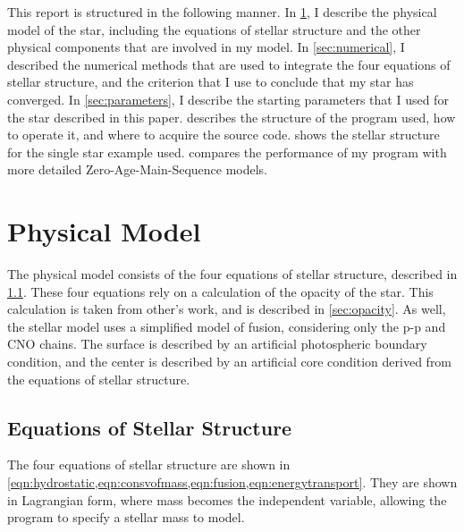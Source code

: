 \documentclass[12pt]{article}
\begin{document}
This report is structured in the following manner. In \cref{sec:physicalmodel}, I describe the physical model of the star, including the equations of stellar structure and the other physical components that are involved in my model. In \cref{sec:numerical}, I described the numerical methods that are used to integrate the four equations of stellar structure, and the criterion that I use to conclude that my star has converged. In \cref{sec:parameters}, I describe the starting parameters that I used for the star described in this paper.  describes the structure of the program used, how to operate it, and where to acquire the source code.  shows the stellar structure for the single star example used.  compares the performance of my program with more detailed Zero-Age-Main-Sequence models.

\section{Physical Model}\label{sec:physicalmodel}
The physical model consists of the four equations of stellar structure, described in \cref{sec:equations}. These four equations rely on a calculation of the opacity of the star. This calculation is taken from other's work, and is described in \cref{sec:opacity}. As well, the stellar model uses a simplified model of fusion, considering only the p-p and CNO chains. The surface is described by an artificial photospheric boundary condition, and the center is described by an artificial core condition derived from the equations of stellar structure.

\subsection{Equations of Stellar Structure} \label{sec:equations}
The four equations of stellar structure are shown in \cref{eqn:hydrostatic,eqn:consvofmass,eqn:fusion,eqn:energytransport}. They are shown in Lagrangian form, where mass becomes the independent variable, allowing the program to specify a stellar mass to model.
\end{document}
